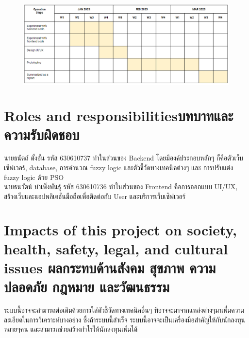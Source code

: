 \begin{figure}[ht]
    \centering
    \includegraphics[scale=0.5]{images/plan.png}
\end{figure}


\section{\ifenglish Roles and responsibilities\else บทบาทและความรับผิดชอบ\fi}
นายธนัตถ์ ตั้งอั้น รหัส 630610737 ทำในส่วนของ Backend โดยมีองค์ประกอบหลักๆ ก็คือตัวเว็บเซิฟเวอร์, database, การคำนวณ fuzzy logic และตัวชี้วัดทางเทคนิคต่างๆ และ
การปรับแต่ง fuzzy logic ด้วย PSO\\
นายธนวัตน์ บำเพ็งพันธุ์ รหัส 630610736 ทำในส่วนของ Frontend คือการออกแบบ UI/UX, สร้างเว็บและแอปพลิเคชันมือถือเพื่อติดต่อกับ User และบริการเว็บเซิฟเวอร์

\section{\ifenglish%
Impacts of this project on society, health, safety, legal, and cultural issues
\else%
ผลกระทบด้านสังคม สุขภาพ ความปลอดภัย กฎหมาย และวัฒนธรรม
\fi}
ระบบนี้อาจจะสามารถต่อเติมด้วยการใส่ตัวชี้วัดทางเทคนิคอื่นๆ ที่อาจจะมาจากแหล่งต่างๆมาเพื่มความละเอียดในการวิเคราะห์บางอย่าง
ซึ่งถ้าระบบนี้สำเร็จ ระบบนี้อาจจะเป็นเครื่องมือสำคัญให้กับนักลงทุนหลายๆคน และสามารถช่วยสร้างกำไรให้นักลงทุนเพิ่มได้ 
